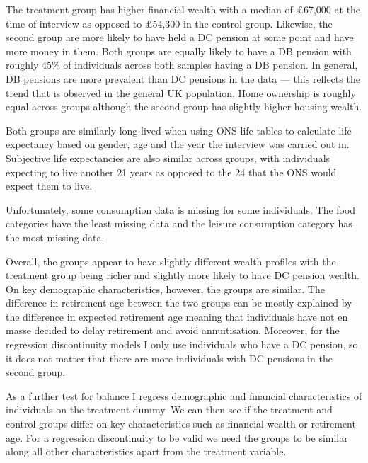 \documentclass[12pt]{article}
\begin{document}
The treatment group has higher financial wealth with a median of £67,000 at the
time of interview as opposed to £54,300 in the control group. Likewise, the
second group are more likely to have held a DC pension at some point and have
more money in them. Both groups are equally likely to have a DB pension with
roughly 45\% of individuals across both samples having a DB pension. In general,
DB pensions are more prevalent than DC pensions in the data --- this reflects the
trend that is observed in the general UK population. Home ownership is roughly
equal across groups although the second group has slightly higher housing
wealth.

Both groups are similarly long-lived when using ONS life tables to calculate
life expectancy based on gender, age and the year the interview was carried out
in. Subjective life expectancies are also similar across groups, with
individuals expecting to live another 21 years as opposed to the 24 that the ONS
would expect them to live.

Unfortunately, some consumption data is missing for some individuals. The food
categories have the least missing data and the leisure consumption category has
the most missing data.

Overall, the groups appear to have slightly different wealth profiles with the
treatment group being richer and slightly more likely to have DC pension wealth.
On key demographic characteristics, however, the groups are similar. The
difference in retirement age between the two groups can be mostly explained by
the difference in expected retirement age meaning that individuals have not en
masse decided to delay retirement and avoid annuitisation. Moreover, for the
regression discontinuity models I only use individuals who have a DC pension, so
it does not matter that there are more individuals with DC pensions in the
second group.

\begin{landscape}
  \linespread{1.25}
  
  \normalsize
\end{landscape}

As a further test for balance I regress demographic and financial
characteristics of individuals on the treatment dummy. We can then see if the
treatment and control groups differ on key characteristics such as financial
wealth or retirement age. For a regression discontinuity to be valid we need the
groups to be similar along all other characteristics apart from the treatment
variable.
\end{document}
